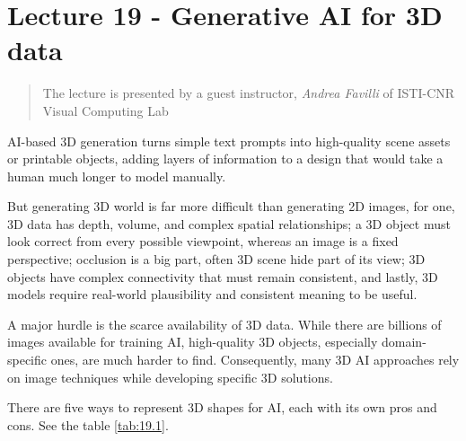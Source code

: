 \chapter{Lecture 19 - Generative AI for 3D data}
\begin{quote}
    The lecture is presented by a guest instructor, \emph{Andrea Favilli} of ISTI-CNR Visual Computing Lab
\end{quote}
AI-based 3D generation turns simple text prompts into high-quality scene assets or printable objects, adding layers of information to a design that would take a human much longer to model manually.\par
But generating 3D world is far more difficult than generating 2D images, for one, 3D data has depth, volume, and complex spatial relationships; a 3D object must look correct from every possible viewpoint, whereas an image is a fixed perspective; occlusion is a big part, often 3D scene hide part of its view; 3D objects have complex connectivity that must remain consistent, and lastly, 3D models require real-world plausibility and consistent meaning to be useful.\par
A major hurdle is the scarce availability of 3D data. While there are billions of images available for training AI, high-quality 3D objects, especially domain-specific ones, are much harder to find. Consequently, many 3D AI approaches rely on image techniques while developing specific 3D solutions.\par
There are five ways to represent 3D shapes for AI, each with its own pros and cons. See the table \ref{tab:19.1}.

